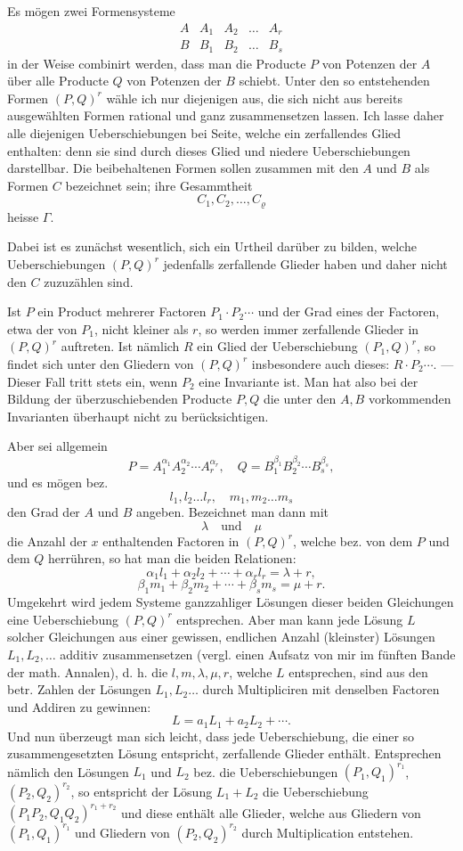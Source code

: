 \documentclass[10pt]{article}
\begin{document}
Es mögen zwei Formensysteme
\[
\begin{array}{ccccc}
A&A_1&A_2&\ldots&A_r\\
B&B_1&B_2&\ldots&B_s
\end{array}
\]
in der Weise combinirt werden, dass man die Producte $P$ von Potenzen der $A$ über alle Producte $Q$ von Potenzen der $B$ schiebt. Unter den so entstehenden Formen $(P,Q)^r$ wähle ich nur diejenigen aus, die sich nicht aus bereits ausgewählten Formen rational und ganz zusammensetzen lassen. Ich lasse daher alle diejenigen Ueberschiebungen bei Seite, welche ein zerfallendes Glied enthalten: denn sie sind durch dieses Glied und niedere Ueberschiebungen darstellbar. Die beibehaltenen Formen sollen zusammen mit den $A$ und $B$ als Formen $C$ bezeichnet sein; ihre Gesammtheit
\[
C_1,C_2,\ldots,C_\varrho
\]
heisse $\Gamma$.

Dabei ist es zunächst wesentlich, sich ein Urtheil darüber zu bilden, welche Ueberschiebungen $(P,Q)^r$ jedenfalls zerfallende Glieder haben und daher nicht den $C$ zuzuzählen sind.

Ist $P$ ein Product mehrerer Factoren $P_1\cdot P_2\cdots$ und der Grad eines der Factoren, etwa der von $P_1$, nicht kleiner als $r$, so werden immer zerfallende Glieder in $(P,Q)^r$ auftreten. Ist nämlich $R$ ein Glied der Ueberschiebung $(P_1,Q)^r$, so findet sich unter den Gliedern von $(P,Q)^r$ insbesondere auch dieses: $R\cdot P_2\cdots$. --- Dieser Fall tritt stets ein, wenn $P_2$ eine Invariante ist. Man hat also bei der Bildung der überzuschiebenden Producte $P,Q$ die unter den $A,B$ vorkommenden Invarianten überhaupt nicht zu berücksichtigen.

Aber sei allgemein
\[
P=A_1^{\alpha_1}A_2^{\alpha_2}\cdots A_r^{\alpha_r},\quad
Q=B_1^{\beta_1}B_2^{\beta_2}\cdots B_s^{\beta_s},
\]
und es mögen bez.
\[
l_1,l_2\ldots l_r,\quad m_1,m_2\ldots m_s
\]
den Grad der $A$ und $B$ angeben. Bezeichnet man dann mit
\[
\lambda\quad\text{und}\quad \mu
\]
die Anzahl der $x$ enthaltenden Factoren in $(P,Q)^r$, welche bez. von dem $P$ und dem $Q$ herrühren, so hat man die beiden Relationen:
\[
\alpha_1l_1+\alpha_2l_2+\cdots+\alpha_rl_r=\lambda+r,
\]
\[
\beta_1m_1+\beta_2m_2+\cdots+\beta_sm_s=\mu+r.
\]
Umgekehrt wird jedem Systeme ganzzahliger Lösungen dieser beiden Gleichungen eine Ueberschiebung $(P,Q)^r$ entsprechen. Aber man kann jede Lösung $L$ solcher Gleichungen aus einer gewissen, endlichen Anzahl (kleinster) Lösungen $L_1,L_2,\ldots$ additiv zusammensetzen (vergl. einen Aufsatz von mir im fünften Bande der math. Annalen), d. h. die $l,m,\lambda,\mu,r$, welche $L$ entsprechen, sind aus den betr. Zahlen der Lösungen $L_1,L_2\ldots$ durch Multipliciren mit denselben Factoren und Addiren zu gewinnen:
\[
L=a_1L_1+a_2L_2+\cdots.
\]
Und nun überzeugt man sich leicht, dass jede Ueberschiebung, die einer so zusammengesetzten Lösung entspricht, zerfallende Glieder enthält. Entsprechen nämlich den Lösungen $L_1$ und $L_2$ bez. die Ueberschiebungen $(P_1,Q_1)^{r_1}$, $(P_2,Q_2)^{r_2}$, so entspricht der Lösung $L_1+L_2$ die Ueberschiebung $(P_1P_2,Q_1Q_2)^{r_1+r_2}$ und diese enthält alle Glieder, welche aus Gliedern von $(P_1,Q_1)^{r_1}$ und Gliedern von $(P_2,Q_2)^{r_2}$ durch Multiplication entstehen.
\end{document}
